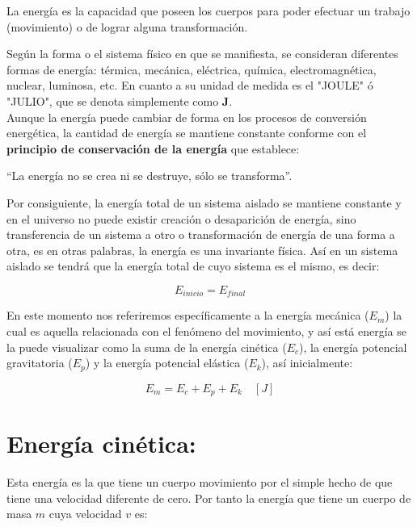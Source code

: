\documentclass[a5paper,pagesize,10pt,bibtotoc,pointlessnumbers,
normalheadings,DIV=9,fleqn,x11names,table,twoside=false]{scrbook}
\begin{document}
\begin{tcolorbox}
La energía es la capacidad que poseen los cuerpos para poder efectuar un trabajo (movimiento) o de lograr alguna transformación.  
\end{tcolorbox}

Según la forma o el sistema físico en que se manifiesta, se consideran diferentes formas de energía: térmica, mecánica, eléctrica, 
química, electromagnética, nuclear, luminosa, etc. En cuanto a su unidad de medida es el "JOULE" ó "JULIO", que se denota 
simplemente como \textbf{J}.\\

Aunque la energía puede cambiar de forma en los procesos de conversión energética, la cantidad de energía se mantiene constante 
conforme con el \textbf{principio de conservación de la energía} que establece:

\begin{tcolorbox}
``La energía no se crea ni se destruye, sólo se transforma''. 
\end{tcolorbox}

Por consiguiente, la energía total de un sistema aislado se mantiene constante y en el universo no puede existir creación o 
desaparición de energía, sino transferencia de un sistema a otro o transformación de energía de una forma a otra, es en otras 
palabras, la energía es una invariante física. Así en un sistema aislado se tendrá que la energía total de cuyo sistema es el 
mismo, es decir:

\begin{equation}
E_{inicio} = E_{final}
\end{equation}

En este momento nos referiremos específicamente a la energía mecánica ($E_m$) la cual es aquella relacionada con el fenómeno del 
movimiento, y así está energía se la puede visualizar como la suma de la energía cinética ($E_c$), la energía potencial 
gravitatoria ($E_p$) y la energía potencial elástica ($E_k$), así inicialmente:

\begin{equation}
E_m = E_c + E_p + E_k \quad [J]
\end{equation} 

\section{Energía cinética:}

Esta energía es la que tiene un cuerpo movimiento por el simple hecho de que tiene una velocidad diferente de cero. Por tanto la 
energía que tiene un cuerpo de masa $m$ cuya velocidad $v$ es:
\end{document}
